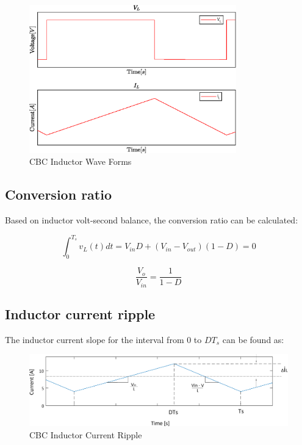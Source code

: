\begin{figure}[H]
   \centering
   \includegraphics[width=0.8\textwidth]{figures/aConventionalBoost/LvAndLi.eps}
    \caption{CBC Inductor Wave Forms}
	\label{fig:CBC_InductorWaveForms}
\end{figure}

\subsection{Conversion ratio}\label{sec:conversionRatio}

Based on inductor volt-second balance, the conversion ratio can be calculated:

\begin{equation}
	\int_{0}^{T_s} v_L(t)dt = V_{in}D + (V_{in}-V_{out})(1-D) = 0
	\label{eq:CBC_VISB}
\end{equation}

\begin{equation}
	\frac{V_o}{V_{in}} = \frac{1}{1-D}
	\label{eq:CBC_CR}
\end{equation}

\subsection{Inductor current ripple}\label{sec:CBC_ICR}

The inductor current slope for the interval from 0 to $DT_s$ can be found as:

\begin{figure}[H]
   \centering
   \includegraphics[width=\textwidth]{figures/aConventionalBoost/InductorCurrent.pdf}
    \caption{CBC Inductor Current Ripple}
	\label{fig:CBC_InductorCurrent}
\end{figure}


